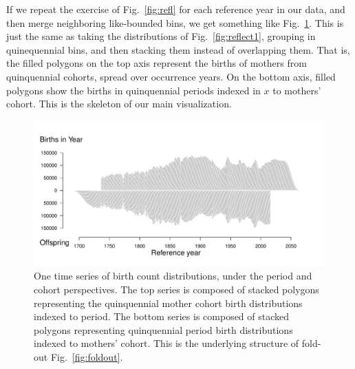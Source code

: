 If we repeat the exercise of Fig.~\ref{fig:refl} for each reference year in our data, and then merge neighboring like-bounded bins, we get something like Fig.~\ref{fig:joinbins}. This is just the same as taking the distributions of Fig.~\ref{fig:reflect1}, grouping in quinequennial bins, and then stacking them instead of overlapping them. That is, the filled polygons on the top axis represent the births of mothers from quinquennial cohorts, spread over occurrence years. On the bottom axis, filled polygons show the births in quinquennial periods indexed in $x$ to mothers' cohort. This is the skeleton of our main visualization.

\begin{figure}[ht!]
 \centering
        \includegraphics[width=\textwidth]{Figures/JoinBins.pdf}
        \caption{One time series of birth count distributions, under the period and cohort perspectives. The top series is composed of stacked polygons representing the quinquennial mother cohort birth distributions indexed to period. The bottom series is composed of stacked polygons representing quinquennial period birth distributions indexed to mothers' cohort. This is the underlying structure of fold-out Fig.~\ref{fig:foldout}.}
          \label{fig:joinbins}
\end{figure}